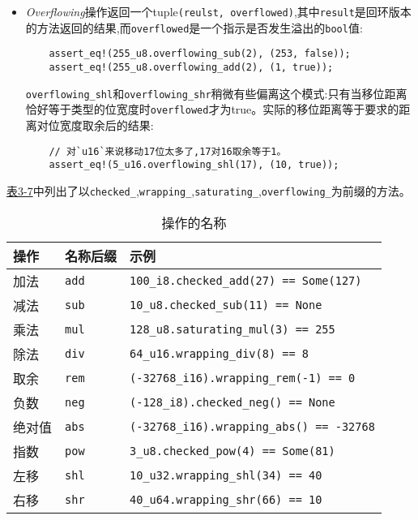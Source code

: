 \begin{itemize}
    \item \emph{Overflowing}操作返回一个tuple\texttt{(reulst, overflowed)},其中\texttt{result}是回环版本的方法返回的结果,而\texttt{overflowed}是一个指示是否发生溢出的\texttt{bool}值:
    \begin{verbatim}
    assert_eq!(255_u8.overflowing_sub(2), (253, false));
    assert_eq!(255_u8.overflowing_add(2), (1, true));
    \end{verbatim}
    \texttt{overflowing\_shl}和\texttt{overflowing\_shr}稍微有些偏离这个模式:只有当移位距离恰好等于类型的位宽度时\texttt{overflowed}才为true。实际的移位距离等于要求的距离对位宽度取余后的结果:
    \begin{verbatim}
    // 对`u16`来说移动17位太多了,17对16取余等于1。
    assert_eq!(5_u16.overflowing_shl(17), (10, true));
    \end{verbatim}
\end{itemize}

\hyperref[t3-7]{表3-7}中列出了以\texttt{checked\_},\texttt{wrapping\_},\texttt{saturating\_},\texttt{overflowing\_}为前缀的方法。
\begin{table}[htbp]
    \centering
    \caption{操作的名称}
    \label{t3-7}
    \begin{tabular}{lll}
        \hline
        \textbf{操作}   & \textbf{名称后缀} &   示例 \\
        \hline
        加法    &   \texttt{add}    & \texttt{100\_i8.checked\_add(27) == Some(127)}    \\
        \rowcolor{tablecolor}
        减法    &   \texttt{sub}    & \texttt{10\_u8.checked\_sub(11) == None}      \\
        乘法    &   \texttt{mul}    & \texttt{128\_u8.saturating\_mul(3) == 255}    \\
        \rowcolor{tablecolor}
        除法    &   \texttt{div}    & \texttt{64\_u16.wrapping\_div(8) == 8}    \\
        取余    &   \texttt{rem}    & \texttt{(-32768\_i16).wrapping\_rem(-1) == 0} \\
        \rowcolor{tablecolor}
        负数    &   \texttt{neg}    & \texttt{(-128\_i8).checked\_neg() == None} \\
        绝对值  &   \texttt{abs}    & \texttt{(-32768\_i16).wrapping\_abs() == -32768} \\
        \rowcolor{tablecolor}
        指数    &   \texttt{pow}    & \texttt{3\_u8.checked\_pow(4) == Some(81)} \\
        左移    &   \texttt{shl}    & \texttt{10\_u32.wrapping\_shl(34) == 40}  \\
        \rowcolor{tablecolor}
        右移    &   \texttt{shr}    & \texttt{40\_u64.wrapping\_shr(66) == 10}  \\
    \end{tabular}
\end{table}

